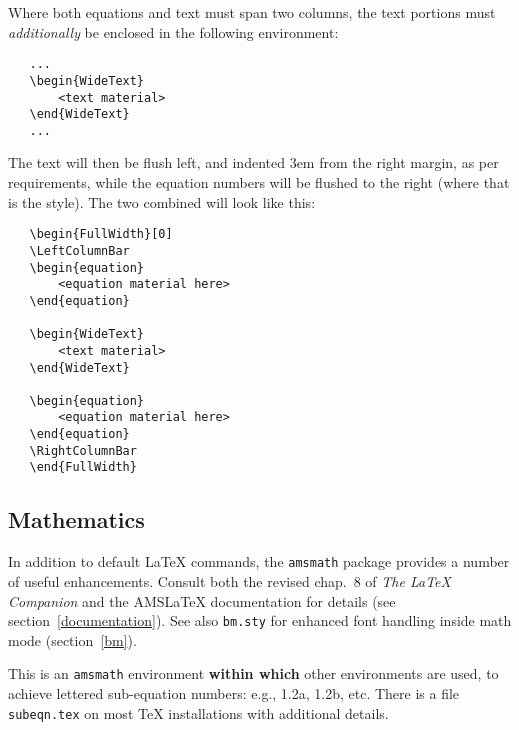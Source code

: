 Where both equations and text must span two columns, the text portions
must \textit{additionally} be enclosed in the following environment:

\begin{verbatim}
   ...
   \begin{WideText}
       <text material>
   \end{WideText}
   ...
\end{verbatim}
%
The text will then be flush left, and indented 3em from the right
margin, as per \NRC{} requirements, while the equation numbers will be
flushed to the right (where that is the style). The two combined will
look like this:

\begin{verbatim}
   \begin{FullWidth}[0]
   \LeftColumnBar
   \begin{equation}
       <equation material here>
   \end{equation}

   \begin{WideText}
       <text material>
   \end{WideText}

   \begin{equation}
       <equation material here>
   \end{equation}
   \RightColumnBar
   \end{FullWidth}
\end{verbatim}


\subsection{Mathematics}

In addition to default \LaTeX{} commands, the \texttt{amsmath} package
provides a number of useful enhancements. Consult both the revised
chap.~8 of \textsl{The \LaTeX{} Companion} and the AMS\LaTeX{}
documentation for details (see section~\ref{documentation}). See also
\verb|bm.sty| for enhanced font handling inside math mode
(section~\ref{bm}).

\begin{description} \itemsep=0pt
   \item [{\tt \blash begin\char`\{equation\char`\}\ ... \blash
         end\char`\{equation\char`\}}] \mbox{} 

   \item [{\tt \blash begin\char`\{array\char`\}\ ... \blash
         end\char`\{array\char`\}}] \mbox{} 

   \item [{\tt \blash begin\char`\{subequation\char`\}\ ... \blash
         end\char`\{subequation\char`\}}]  \mbox{}

        This is an \verb|amsmath| environment {\bf within which}
        other environments are used, to achieve lettered sub-equation
        numbers: e.g., 1.2a, 1.2b, etc. There is a file
        \texttt{subeqn.tex} on most \TeX{} installations with
        additional details.
\end{description}

